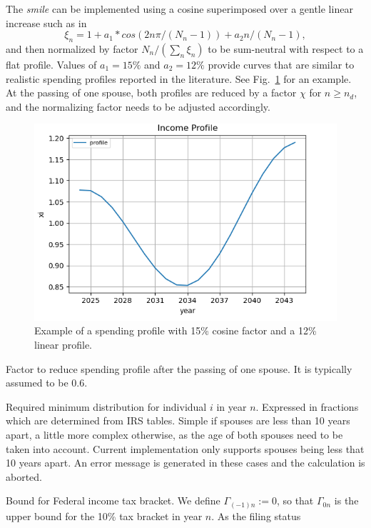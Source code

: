 \documentclass{report}[fleqn,12pt]
\begin{document}
\begin{description}[leftmargin=4em,style=multiline]
	The {\em smile} can be implemented using a cosine superimposed over a gentle linear increase
	such as in
	\begin{equation}
		\xi_n = 1 + a_1*cos(2n\pi/(N_n-1)) + a_2n/(N_n-1),
	\end{equation}
	and then normalized by factor $N_n/(\sum_n \xi_n )$ to be sum-neutral with respect to a flat profile.
	Values of $a_1 = 15\%$ and $a_2=12\%$ provide curves that are similar to realistic
		spending profiles reported in the literature. See Fig.~\ref{Fig:profile} for an example.
	At the passing of one spouse, both profiles are reduced by a factor $\chi$ for $n \ge n_d$,
	and the normalizing factor needs to be adjusted accordingly.
		\begin{figure}[t]
		\includegraphics{profile.png}
		\caption{\small Example of a spending profile with 15\% cosine factor and a 12\% linear
		profile. \label{Fig:profile}}
		\end{figure}
\item [$\chi$]
	Factor to reduce spending profile after the passing of one spouse. It is typically
	assumed to be 0.6.
\item [$\rho_{in}$]
	Required minimum distribution for individual $i$ in year $n$. Expressed in fractions
	which are determined from IRS tables. Simple if spouses are less than 10 years apart,
	a little more complex otherwise, as the age of both spouses need to be taken into account.
	Current implementation only supports spouses being less that 10 years apart.
	An error message is generated in these cases and the calculation is aborted.
\item [$\Gamma_{tn}$]
	Bound for Federal income tax bracket. We define $\Gamma_{(-1)n} := 0$, so that
	$\Gamma_{0n}$ is the upper bound for the 10\% tax bracket in year $n$. As the filing status

\end{description}
\end{document}
